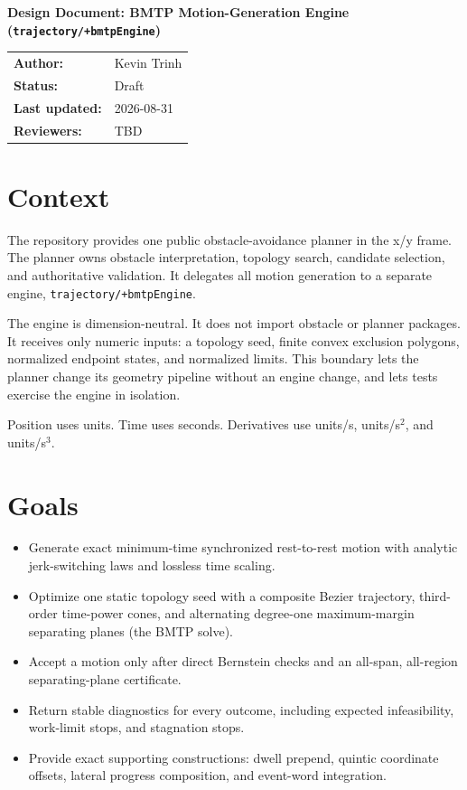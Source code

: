 \documentclass[11pt]{article}
\begin{document}
\begin{center}
    {\LARGE\bfseries Design Document: BMTP Motion-Generation Engine
    (\texttt{trajectory/+bmtpEngine})\par}
    \vspace{1.5em}
    \begin{tabular}{@{}ll@{}}
        \textbf{Author:} & Kevin Trinh \\
        \textbf{Status:} & Draft \\
        \textbf{Last updated:} & 2026-08-31 \\
        \textbf{Reviewers:} & TBD
    \end{tabular}
\end{center}

\tableofcontents
\newpage

\section{Context}

The repository provides one public obstacle-avoidance planner in the
x/y frame. The planner owns obstacle interpretation, topology
search, candidate selection, and authoritative validation. It delegates all
motion generation to a separate engine, \texttt{trajectory/+bmtpEngine}.

The engine is dimension-neutral. It does not import obstacle or planner
packages. It receives only numeric inputs: a topology seed, finite convex
exclusion polygons, normalized endpoint states, and normalized limits. This
boundary lets the planner change its geometry pipeline without an engine
change, and lets tests exercise the engine in isolation.

Position uses units. Time uses seconds. Derivatives use units/s,
units/s$^2$, and units/s$^3$.

\section{Goals}

\begin{itemize}
    \item Generate exact minimum-time synchronized rest-to-rest motion with analytic
    jerk-switching laws and lossless time scaling.
    \item Optimize one static topology seed with a composite Bezier trajectory,
    third-order time-power cones, and alternating degree-one maximum-margin
    separating planes (the BMTP solve).
    \item Accept a motion only after direct Bernstein checks and an all-span,
    all-region separating-plane certificate.
    \item Return stable diagnostics for every outcome, including expected
    infeasibility, work-limit stops, and stagnation stops.
    \item Provide exact supporting constructions: dwell prepend, quintic coordinate
    offsets, lateral progress composition, and event-word integration.
\end{itemize}
\end{document}

